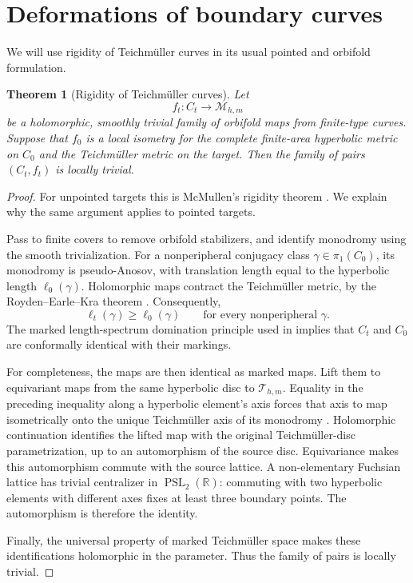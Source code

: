 \documentclass[11pt]{article}
\newcommand{\M}{\mathcal M}
\newcommand{\T}{\mathcal T}
\newtheorem{theorem}{Theorem}[section]
\theoremstyle{remark}
\begin{document}
\section{Deformations of boundary curves}

We will use rigidity of Teichm\"uller curves in its usual
pointed and orbifold formulation.

\begin{theorem}[Rigidity of Teichm\"uller curves]\label{thm:McM}
Let
\[
f_t:C_t\longrightarrow \M_{h,m}
\]
be a holomorphic, smoothly trivial family of orbifold maps from
finite-type curves. Suppose that \(f_0\) is a local isometry for
the complete finite-area hyperbolic metric on \(C_0\) and the
Teichm\"uller metric on the target. Then the family of pairs
\((C_t,f_t)\) is locally trivial.
\end{theorem}

\begin{proof}
For unpointed targets this is McMullen's rigidity theorem
\cite[Theorem~1]{McM}. We explain why the same argument applies
to pointed targets.

Pass to finite covers to remove orbifold stabilizers, and
identify monodromy using the smooth trivialization. For a
nonperipheral conjugacy class \(\gamma\in\pi_1(C_0)\), its
monodromy is pseudo-Anosov, with translation length equal to
the hyperbolic length \(\ell_0(\gamma)\). Holomorphic maps
contract the Teichm\"uller metric, by the
Royden--Earle--Kra theorem \cite{Royden,EK}. Consequently,
\[
\ell_t(\gamma)\geq \ell_0(\gamma)
\qquad\text{for every nonperipheral }\gamma.
\]
The marked length-spectrum domination principle used in
\cite[proof of Theorem~1, fact~(1)]{McM} implies that \(C_t\)
and \(C_0\) are conformally identical with their markings.

For completeness, the maps are then identical as marked maps.
Lift them to equivariant maps from the same hyperbolic disc to
\(\T_{h,m}\). Equality in the preceding inequality along a
hyperbolic element's axis forces that axis to map isometrically
onto the unique Teichm\"uller axis of its monodromy
\cite{Bers}. Holomorphic continuation identifies the lifted map
with the original Teichm\"uller-disc parametrization, up to an
automorphism of the source disc. Equivariance makes this
automorphism commute with the source lattice. A non-elementary
Fuchsian lattice has trivial centralizer in
\(\operatorname{PSL}_2(\mathbb R)\): commuting with two
hyperbolic elements with different axes fixes at least three
boundary points. The automorphism is therefore the identity.

Finally, the universal property of marked Teichm\"uller space
makes these identifications holomorphic in the parameter.
Thus the family of pairs is locally trivial.
\end{proof}
\end{document}
